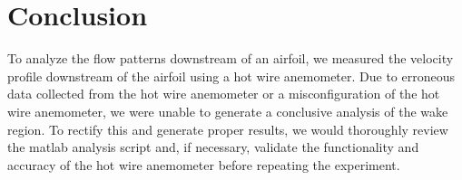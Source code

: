 \chapter{Conclusion}
\label{cp:conclusion}

To analyze the flow patterns downstream of an airfoil, we measured the velocity profile downstream of the airfoil using a hot wire anemometer. Due to erroneous data collected from the hot wire anemometer or a misconfiguration of the hot wire anemometer, we were unable to generate a conclusive analysis of the wake region. To rectify this and generate proper results, we would thoroughly review the \acrshort{matlab} analysis script and, if necessary, validate the functionality and accuracy of the hot wire anemometer before repeating the experiment.